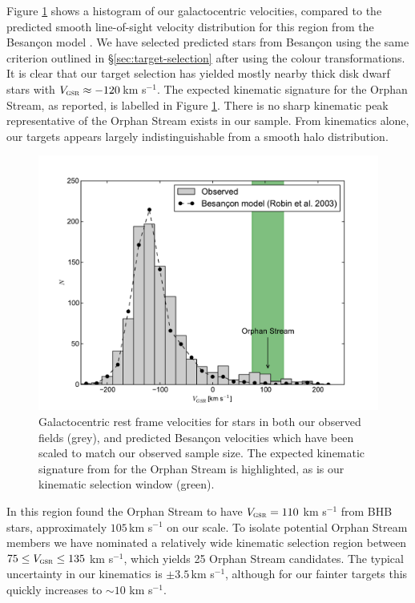 \documentclass{emulateapj}
\begin{document}
Figure \ref{fig:velocities} shows a histogram of our galactocentric velocities, compared to the predicted smooth line-of-sight velocity distribution for this region from the Besan\c{c}on model \citep{Robin;et-al_2003}. We have selected predicted stars from Besan\c{c}on using the same criterion outlined in \S\ref{sec:target-selection} after using the \citet{Jordi;et-al_2006} colour transformations. It is clear that our target selection has yielded mostly nearby thick disk dwarf stars with $V_{\textsc{gsr}} \approx -120$\,km s$^{-1}$. The expected kinematic signature for the Orphan Stream, as \citet{Newberg;et-al_2010} reported, is labelled in Figure \ref{fig:velocities}. There is no sharp kinematic peak representative of the Orphan Stream exists in our sample. From kinematics alone, our targets appears largely indistinguishable from a smooth halo distribution.

\begin{figure}[h]
	\includegraphics[width=\columnwidth]{./figures/vgsr-histogram.pdf}
	\caption{Galactocentric rest frame velocities for stars in both our observed fields (grey), and predicted Besan\c{c}on velocities which have been scaled to match our observed sample size. The expected kinematic signature from \citet{Newberg;et-al_2010} for the Orphan Stream is highlighted, as is our kinematic selection window (green).}
	\label{fig:velocities}
\end{figure}

In this region \citet{Newberg;et-al_2010} found the Orphan Stream to have $V_{\textsc{gsr}} = 110$ km s$^{-1}$ from BHB stars, approximately $105$\,km s$^{-1}$ on our scale. To isolate potential Orphan Stream members we have nominated a relatively wide kinematic selection region between $75 \leq V_{\textsc{gsr}} \leq 135$ km s$^{-1}$, which yields 25 Orphan Stream candidates. The typical uncertainty in our kinematics is $\pm{}3.5$\,km s$^{-1}$, although for our fainter targets this quickly increases to $\sim10$ km s$^{-1}$.
\end{document}
